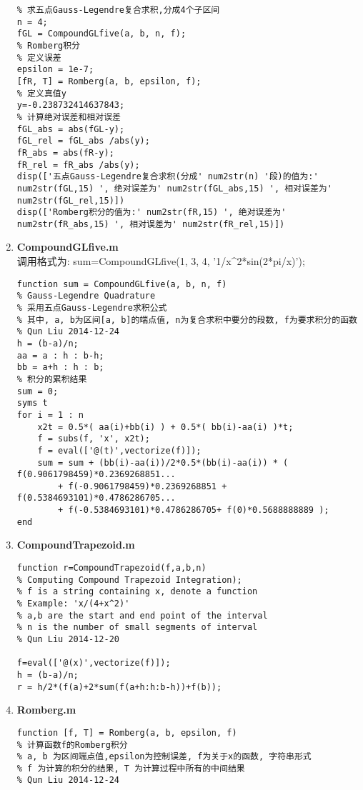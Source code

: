 \documentclass[a4paper]{article}
\begin{document}
\begin{spacing}{1.5}
\begin{CJK*}{GBK}{song}
\begin{scriptsize}
\begin{enumerate}[(1)]
\begin{lstlisting}
% 求五点Gauss-Legendre复合求积,分成4个子区间
n = 4;
fGL = CompoundGLfive(a, b, n, f);
% Romberg积分
% 定义误差
epsilon = 1e-7;
[fR, T] = Romberg(a, b, epsilon, f);
% 定义真值y
y=-0.238732414637843;
% 计算绝对误差和相对误差
fGL_abs = abs(fGL-y);
fGL_rel = fGL_abs /abs(y);
fR_abs = abs(fR-y);
fR_rel = fR_abs /abs(y);
disp(['五点Gauss-Legendre复合求积(分成' num2str(n) '段)的值为:' num2str(fGL,15) ', 绝对误差为' num2str(fGL_abs,15) ', 相对误差为' num2str(fGL_rel,15)])
disp(['Romberg积分的值为:' num2str(fR,15) ', 绝对误差为' num2str(fR_abs,15) ', 相对误差为' num2str(fR_rel,15)])
\end{lstlisting}


\item \textbf{CompoundGLfive.m} \\
调用格式为: sum=CompoundGLfive(1, 3, 4, '1/x\^{}2*sin(2*pi/x)');
\begin{lstlisting}
function sum = CompoundGLfive(a, b, n, f)
% Gauss-Legendre Quadrature
% 采用五点Gauss-Legendre求积公式
% 其中, a, b为区间[a, b]的端点值, n为复合求积中要分的段数, f为要求积分的函数
% Qun Liu 2014-12-24
h = (b-a)/n;
aa = a : h : b-h;
bb = a+h : h : b;
% 积分的累积结果
sum = 0;
syms t
for i = 1 : n
    x2t = 0.5*( aa(i)+bb(i) ) + 0.5*( bb(i)-aa(i) )*t;
    f = subs(f, 'x', x2t);
    f = eval(['@(t)',vectorize(f)]);
    sum = sum + (bb(i)-aa(i))/2*0.5*(bb(i)-aa(i)) * ( f(0.9061798459)*0.2369268851...
        + f(-0.9061798459)*0.2369268851 + f(0.5384693101)*0.4786286705...
        + f(-0.5384693101)*0.4786286705+ f(0)*0.5688888889 );
end
\end{lstlisting}


\item \textbf{CompoundTrapezoid.m} \\
\begin{lstlisting}
function r=CompoundTrapezoid(f,a,b,n)
% Computing Compound Trapezoid Integration);
% f is a string containing x, denote a function
% Example: 'x/(4+x^2)'
% a,b are the start and end point of the interval
% n is the number of small segments of interval
% Qun Liu 2014-12-20

f=eval(['@(x)',vectorize(f)]);
h = (b-a)/n;
r = h/2*(f(a)+2*sum(f(a+h:h:b-h))+f(b));
\end{lstlisting}

\item \textbf{Romberg.m} \\
\begin{lstlisting}
function [f, T] = Romberg(a, b, epsilon, f)
% 计算函数f的Romberg积分
% a, b 为区间端点值,epsilon为控制误差, f为关于x的函数, 字符串形式
% f 为计算的积分的结果, T 为计算过程中所有的中间结果
% Qun Liu 2014-12-24


\end{lstlisting}
\end{enumerate}
\end{scriptsize}
\end{CJK*}
\end{spacing}
\end{document}
